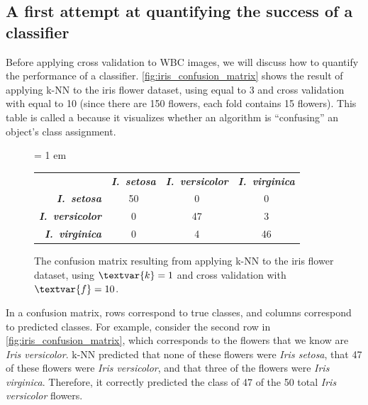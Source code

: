 \FloatBarrier
{}
\subsection{A first attempt at quantifying the success of a classifier}

Before applying cross validation to WBC images, we will discuss how to quantify the performance of a classifier. \autoref{fig:iris_confusion_matrix} shows the result of applying k-NN to the iris flower dataset, using  equal to 3 and cross validation with  equal to 10 (since there are 150 flowers, each fold contains 15 flowers). This table is called a  because it visualizes whether an algorithm is ``confusing'' an object's class assignment.

\begin{figure}[h]
\centering
\tabcolsep = 1 em
\mySfFamily
{}
\begin{tabular}{r c c c}
\rowcolor{gray!50}
& \textbf{\textit{I.~setosa}} & \textbf{\textit{I.~versicolor}} & \textbf{\textit{I.~virginica}} \\
\textbf{\textit{I.~setosa}} & 50 & \phantom{5}0 & \phantom{5}0 \\
\textbf{\textit{I.~versicolor}} & \phantom{5}0 & 47 & \phantom{5}3 \\
\textbf{\textit{I.~virginica}} & \phantom{5}0 & \phantom{5}4 & 46
\end{tabular}
\caption{The confusion matrix resulting from applying k-NN to the iris flower dataset, using $\textvar{k} = \text{1}$ and cross validation with $\textvar{f} = \text{10}$.}
\label{fig:iris_confusion_matrix}
\end{figure}

In a confusion matrix, rows correspond to true classes, and columns correspond to predicted classes. For example, consider the second row in \autoref{fig:iris_confusion_matrix}, which corresponds to the flowers that we know are \textit{Iris versicolor}. k-NN predicted that none of these flowers were \textit{Iris setosa}, that 47 of these flowers were \textit{Iris versicolor}, and that three of the flowers were \textit{Iris virginica}. Therefore, it correctly predicted the class of 47 of the 50 total \textit{Iris versicolor} flowers.\\

